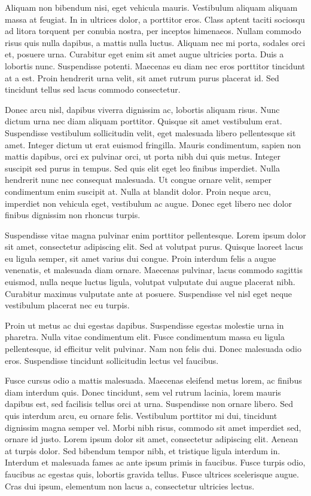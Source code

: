 Aliquam non bibendum nisi, eget vehicula mauris. Vestibulum aliquam aliquam massa at feugiat. In in ultrices dolor, a porttitor eros. Class aptent taciti sociosqu ad litora torquent per conubia nostra, per inceptos himenaeos. Nullam commodo risus quis nulla dapibus, a mattis nulla luctus. Aliquam nec mi porta, sodales orci et, posuere urna. Curabitur eget enim sit amet augue ultricies porta. Duis a lobortis nunc. Suspendisse potenti. Maecenas eu diam nec eros porttitor tincidunt at a est. Proin hendrerit urna velit, sit amet rutrum purus placerat id. Sed tincidunt tellus sed lacus commodo consectetur.

Donec arcu nisl, dapibus viverra dignissim ac, lobortis aliquam risus. Nunc dictum urna nec diam aliquam porttitor. Quisque sit amet vestibulum erat. Suspendisse vestibulum sollicitudin velit, eget malesuada libero pellentesque sit amet. Integer dictum ut erat euismod fringilla. Mauris condimentum, sapien non mattis dapibus, orci ex pulvinar orci, ut porta nibh dui quis metus. Integer suscipit sed purus in tempus. Sed quis elit eget leo finibus imperdiet. Nulla hendrerit nunc nec consequat malesuada. Ut congue ornare velit, semper condimentum enim suscipit at. Nulla at blandit dolor. Proin neque arcu, imperdiet non vehicula eget, vestibulum ac augue. Donec eget libero nec dolor finibus dignissim non rhoncus turpis.

Suspendisse vitae magna pulvinar enim porttitor pellentesque. Lorem ipsum dolor sit amet, consectetur adipiscing elit. Sed at volutpat purus. Quisque laoreet lacus eu ligula semper, sit amet varius dui congue. Proin interdum felis a augue venenatis, et malesuada diam ornare. Maecenas pulvinar, lacus commodo sagittis euismod, nulla neque luctus ligula, volutpat vulputate dui augue placerat nibh. Curabitur maximus vulputate ante at posuere. Suspendisse vel nisl eget neque vestibulum placerat nec eu turpis.

Proin ut metus ac dui egestas dapibus. Suspendisse egestas molestie urna in pharetra. Nulla vitae condimentum elit. Fusce condimentum massa eu ligula pellentesque, id efficitur velit pulvinar. Nam non felis dui. Donec malesuada odio eros. Suspendisse tincidunt sollicitudin lectus vel faucibus.

Fusce cursus odio a mattis malesuada. Maecenas eleifend metus lorem, ac finibus diam interdum quis. Donec tincidunt, sem vel rutrum lacinia, lorem mauris dapibus est, sed facilisis tellus orci at urna. Suspendisse non ornare libero. Sed quis interdum arcu, eu ornare felis. Vestibulum porttitor mi dui, tincidunt dignissim magna semper vel. Morbi nibh risus, commodo sit amet imperdiet sed, ornare id justo. Lorem ipsum dolor sit amet, consectetur adipiscing elit. Aenean at turpis dolor. Sed bibendum tempor nibh, et tristique ligula interdum in. Interdum et malesuada fames ac ante ipsum primis in faucibus. Fusce turpis odio, faucibus ac egestas quis, lobortis gravida tellus. Fusce ultrices scelerisque augue. Cras dui ipsum, elementum non lacus a, consectetur ultricies lectus.

